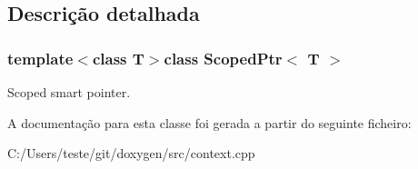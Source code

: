 \subsection{Descrição detalhada}
\subsubsection*{template$<$class T$>$class Scoped\-Ptr$<$ T $>$}

Scoped smart pointer. 

A documentação para esta classe foi gerada a partir do seguinte ficheiro\-:\begin{DoxyCompactItemize}
\item 
C\-:/\-Users/teste/git/doxygen/src/context.\-cpp\end{DoxyCompactItemize}
